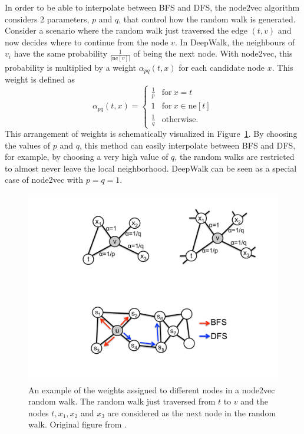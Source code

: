 In order to be able to interpolate between BFS and DFS, the node2vec algorithm considers 2 parameters, \( p \) and \( q \), that control how the random walk is generated. Consider a scenario where the random walk just traversed the edge \( \left( t, v \right) \) and now decides where to continue from the node \( v \). In DeepWalk, the neighbours of \( v_i \) have the same probability \( \frac{1}{\left\lvert \mathrm{ne}[v] \right\rvert} \) of being the next node. With node2vec, this probability is multiplied by a weight \( \alpha_{pq} \left( t, x \right) \) for each candidate node \( x \). This weight is defined as
\begin{equation}\label{node2vec-weight}
	\alpha_{pq} \left( t, x \right) = \begin{cases}
		\frac{1}{p} & \text{for}\ x = t \\
		1 & \text{for}\ x \in \mathrm{ne}[t] \\
		\frac{1}{q} & \text{otherwise.}
	\end{cases}
\end{equation}
This arrangement of weights is schematically visualized in Figure~\ref{fig:node2vec-weights}. By choosing the values of \( p \) and \( q \), this method can easily interpolate between BFS and DFS, for example, by choosing a very high value of \( q \), the random walks are restricted to almost never leave the local neighborhood. DeepWalk can be seen as a special case of node2vec with \( p = q = 1 \).

\begin{figure}
	\includegraphics[width=0.6\linewidth]{images/node2vec-weights.pdf}
	\caption{An example of the weights assigned to different nodes in a node2vec random walk. The random walk just traversed from \( t \) to \( v \) and the nodes \( t, x_1, x_2 \) and \( x_3 \) are considered as the next node in the random walk. Original figure from \cite{grover_node2vec_2016}.}
	\label{fig:node2vec-weights}
\end{figure}



